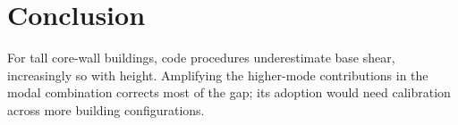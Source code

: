 \chapter{Conclusion}
\label{ch:conclusion}

For tall core-wall buildings, code procedures underestimate base shear, increasingly so with
height. Amplifying the higher-mode contributions in the modal combination corrects most of the
gap; its adoption would need calibration across more building configurations.
